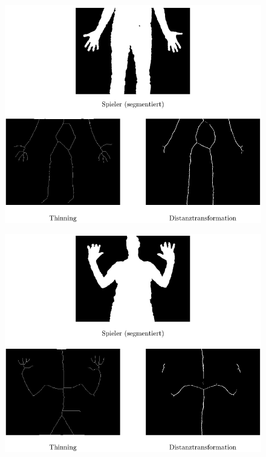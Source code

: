 \begin{figure}[htbp]
\centering
\includegraphics[width=1.0\linewidth]{./fig/vergleich-screenshot0}
\caption{}
\label{fig:vergleich-screenshot0}
\end{figure}
\begin{figure}[htbp]
\centering
\includegraphics[width=1.0\linewidth]{./fig/vergleich-screenshot12}
\caption{}
\label{fig:vergleich-screenshot12}
\end{figure}
\clearpage
\newpage
